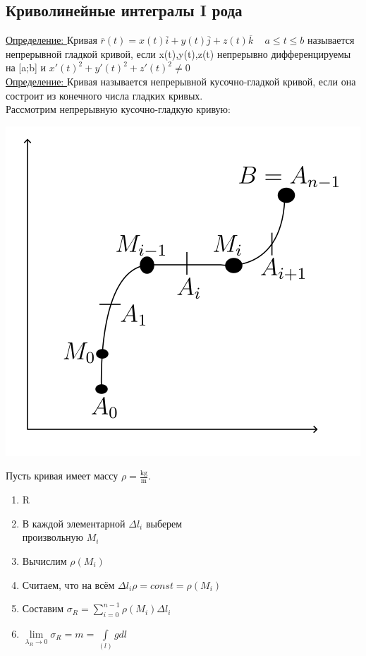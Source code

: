 \documentclass[12pt]{article}
\let\ORIincludegraphics\includegraphics
\renewcommand{\includegraphics}[2][]{\ORIincludegraphics[scale=0.65,#1]{#2}}
\let\oldint\int
\let\oldsum\sum
\let\oldlim\lim
\renewcommand{\int}{\oldint\limits}
\renewcommand{\sum}{\oldsum\limits}
\renewcommand{\lim}{\oldlim\limits}
\begin{document}
  \subsection{Криволинейные интегралы I рода}
  \underline{Определение: } Кривая $\overline{r}(t)=x(t)\overline{i}+y(t)\overline{j}+z(t)\overline{k} \hspace{10pt}$
  $a \leq t \leq b$ называется непрерывной гладкой кривой, если x(t),y(t),z(t) непрерывно дифференцируемы
  на [a;b] и $x'(t)^2+y'(t)^2+z'(t)^2 \not = 0$\\
  \underline{Определение: } Кривая называется непрерывной кусочно-гладкой кривой, если она состроит из конечного числа
  гладких кривых.\\
  Рассмотрим непрерывную кусочно-гладкую кривую:\\
  \begin{minipage}{0.45\textwidth} %
      \includegraphics[width=\linewidth]{8.1.1.png}
  \end{minipage}%
  \hspace{1em} %
  \begin{minipage}{0.65\textwidth} %
      Пусть кривая имеет массу $\rho=\frac{\mathrm{kg}}{\mathrm{m}}$.
      \begin{enumerate}
        \item R
        \item В каждой элементарной $\Delta l_i$ выберем\\ произвольную $M_i$ 
        \item Вычислим $\rho(M_i)$
        \item Считаем, что на всём $\Delta l_i \rho=const=\rho(M_i)$
        \item Составим $\sigma_R=\sum_{i=0}^{n-1}\rho(M_i)\Delta l_i$
        \item $\lim_{\lambda_R \to 0} \sigma_R = m = \int_{(l)} g dl$
      \end{enumerate}
  \end{minipage}
\end{document}
